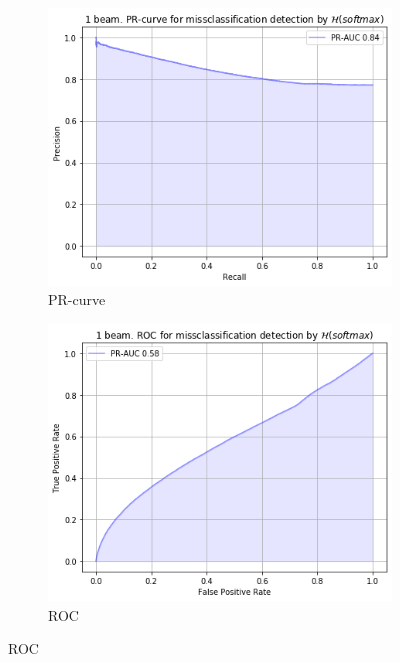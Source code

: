 \documentclass[a4paper,14pt]{extarticle}
\begin{document}
		
	\begin{figure}[t]
		\begin{subfigure}{.45\textwidth}
			\centering
			\includegraphics[width=1\textwidth]{images/malinin_eq_tu.png}
			\caption{PR-curve} \label{fig:malinin_eq_tu}
		\end{subfigure}
		\begin{subfigure}{.45\textwidth}
			\centering
			\includegraphics[width=1\textwidth]{images/malinin_eq_tu_roc.png}
			\caption{ROC} \label{fig:malinin_eq_tu_roc}
		\end{subfigure}
	\end{figure}	
\end{document}
